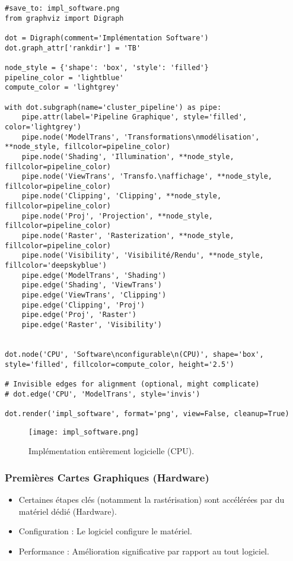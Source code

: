 \documentclass{article}
\begin{document}
\begin{verbatim}
#save_to: impl_software.png
from graphviz import Digraph

dot = Digraph(comment='Implémentation Software')
dot.graph_attr['rankdir'] = 'TB'

node_style = {'shape': 'box', 'style': 'filled'}
pipeline_color = 'lightblue'
compute_color = 'lightgrey'

with dot.subgraph(name='cluster_pipeline') as pipe:
    pipe.attr(label='Pipeline Graphique', style='filled', color='lightgrey')
    pipe.node('ModelTrans', 'Transformations\nmodélisation', **node_style, fillcolor=pipeline_color)
    pipe.node('Shading', 'Illumination', **node_style, fillcolor=pipeline_color)
    pipe.node('ViewTrans', 'Transfo.\naffichage', **node_style, fillcolor=pipeline_color)
    pipe.node('Clipping', 'Clipping', **node_style, fillcolor=pipeline_color)
    pipe.node('Proj', 'Projection', **node_style, fillcolor=pipeline_color)
    pipe.node('Raster', 'Rasterization', **node_style, fillcolor=pipeline_color)
    pipe.node('Visibility', 'Visibilité/Rendu', **node_style, fillcolor='deepskyblue')
    pipe.edge('ModelTrans', 'Shading')
    pipe.edge('Shading', 'ViewTrans')
    pipe.edge('ViewTrans', 'Clipping')
    pipe.edge('Clipping', 'Proj')
    pipe.edge('Proj', 'Raster')
    pipe.edge('Raster', 'Visibility')


dot.node('CPU', 'Software\nconfigurable\n(CPU)', shape='box', style='filled', fillcolor=compute_color, height='2.5')

# Invisible edges for alignment (optional, might complicate)
# dot.edge('CPU', 'ModelTrans', style='invis')

dot.render('impl_software', format='png', view=False, cleanup=True)
\end{verbatim}

\begin{figure}[H]
\centering
\texttt{[image: impl\_software.png]}
\caption{Implémentation entièrement logicielle (CPU).}
\label{fig:impl_software}
\end{figure}


\subsubsection{Premières Cartes Graphiques (Hardware)}
\begin{itemize}
    \item Certaines étapes clés (notamment la rastérisation) sont accélérées par du matériel dédié (Hardware).
    \item Configuration : Le logiciel configure le matériel.
    \item Performance : Amélioration significative par rapport au tout logiciel.
\end{itemize}
\end{document}
